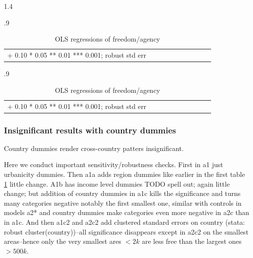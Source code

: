 \documentclass[10pt, letterpaper]{article}
\begin{document}
\begin{spacing}{1.4}
\begin{spacing}{.9} \begin{table}[H]\centering\begin{scriptsize}
\begin{tabular}{p{.8in}p{.55in}p{.55in}p{.55in}p{.55in}p{.55in}p{.55in}p{.55in}p{.55in}p{.55in}}\hline
\hline + 0.10 * 0.05 ** 0.01 *** 0.001; robust std err
\end{tabular}\end{scriptsize}\caption{\label{regA}OLS regressions of freedom/agency}
\end{table}\end{spacing}

\begin{spacing}{.9} \begin{table}[H]\centering\begin{scriptsize}
\begin{tabular}{p{.8in}p{.55in}p{.55in}p{.55in}p{.55in}p{.55in}p{.55in}p{.55in}p{.55in}p{.55in}}\hline
\hline + 0.10 * 0.05 ** 0.01 *** 0.001; robust std err
\end{tabular}\end{scriptsize}\caption{\label{regB}OLS regressions of freedom/agency}
\end{table}\end{spacing}

\subsubsection{Insignificant results with country dummies}

Country dummies render cross-country patters insignificant. 

Here we conduct important sensitivity/robustness checks. First in a1 just
urbanicity dummies. Then a1a adds region dummies like earlier in the first table
\ref{regA} little change. A1b has income level dummies TODO spell out; again
little change; but addition of country dummies in a1c kills the significance and
turns many categories negative notably the first smallest one, similar with
controls in models a2* and country dummies make categories even more negative
in a2c than in a1c. And then a1c2 and a2c2 add clustered standard errors on
country (stata: robust cluster(country))--all significance disappears except in
a2c2 on the smallest areas--hence only the very smallest ares $<2k$ are less free
than the largest ones $>500k$.




\end{spacing}
\end{document}

